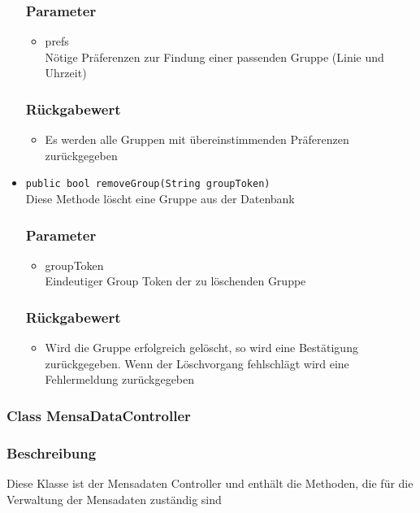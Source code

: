 \documentclass[a4paper]{scrreprt}
\begin{document}
\begin{addmargin}[25pt]{0pt}
\begin{itemize}
	\subsubsection*{Parameter}
	\begin{itemize}
	\item prefs \\
		Nötige Präferenzen zur Findung einer passenden Gruppe (Linie und Uhrzeit)
	\end{itemize}
	\subsubsection*{Rückgabewert}
	\begin{itemize}
	\item Es werden alle Gruppen mit übereinstimmenden Präferenzen zurückgegeben
	\end{itemize}

\item \texttt{public bool removeGroup(String groupToken)}\\
	Diese Methode löscht eine Gruppe aus der Datenbank
	\subsubsection*{Parameter}
	\begin{itemize}
	\item groupToken \\
		Eindeutiger Group Token der zu löschenden Gruppe
	\end{itemize}
	\subsubsection*{Rückgabewert}
	\begin{itemize}
	\item Wird die Gruppe erfolgreich gelöscht, so wird eine Bestätigung zurückgegeben. Wenn der Löschvorgang fehlschlägt wird eine Fehlermeldung zurückgegeben
	\end{itemize}
\end{itemize}
\end{addmargin}

\subsubsection{Class MensaDataController}
\subsubsection*{Beschreibung}
Diese Klasse ist der Mensadaten Controller und enthält die Methoden, die für die Verwaltung der Mensadaten zuständig sind
\end{document}
